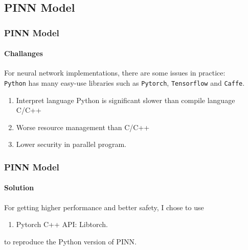 \subsection{PINN Model}
\begin{frame}
  \frametitle{PINN Model}
  \framesubtitle{Challanges}
  For neural network implementations, there are some issues in practice:\\
  \texttt{Python} has many easy-use libraries such as \texttt{Pytorch}, \texttt{Tensorflow} and \texttt{Caffe}.
  \begin{enumerate}
    \item Interpret language Python is significant slower than compile language C/C++
    \item Worse resource management than C/C++
    \item Lower security in parallel program.
  \end{enumerate}
\end{frame}



\begin{frame}
  \frametitle{PINN Model}
  \framesubtitle{Solution}
  For getting higher performance and better safety, I chose to use
  \begin{enumerate}
    \item Pytorch C++ API: Libtorch.
  \end{enumerate}
  to reproduce the Python version of PINN.


\end{frame}